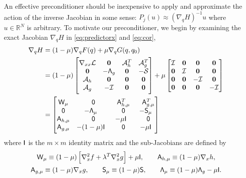 An effective preconditioner should be inexpensive to apply and approximate the
action of the inverse Jacobian in some sense: $P_j(u) \approx (\nabla_q H)^{-1}
u$ where $u \in \mathbb{R}^{N}$ is arbitrary.  To motivate our preconditioner,
we begin by examining the exact Jacobian $\nabla_q H$ in  \eqref{eq:predictorx} and \eqref{eq:cor}, 
\begin{equation}\label{eq:dHdq}
\begin{aligned}
\nabla_q H &= (1 - \mu) \nabla_{q} F(q) + \mu \nabla_q G(q,q_0) \\
&=  (1-\mu)\begin{bmatrix}
 \nabla_{xx} \mathcal{L}   & \boldsymbol{0} & \mathcal{A}^T_h   & \mathcal{A}^T_g   \\
\boldsymbol{0}     &   - \mathsf{\Lambda}_g   & \boldsymbol{0} & -\mathcal{S}     \\
\mathcal{A}_h  &  \boldsymbol{0}   & \boldsymbol{0} &  \boldsymbol{0}  \\
\mathcal{A}_g  & -\mathcal{I}  &  \boldsymbol{0}  & \boldsymbol{0}   \\
\end{bmatrix}
+ \mu \begin{bmatrix}
\mathcal{I} & \boldsymbol{0} & \boldsymbol{0} & \boldsymbol{0} \\
\boldsymbol{0}  & \mathcal{I}  & \boldsymbol{0} & \boldsymbol{0} \\
\boldsymbol{0} & \boldsymbol{0} & -\mathcal{I} &  \boldsymbol{0} \\
\boldsymbol{0} & \boldsymbol{0} &   \boldsymbol{0} & -\mathcal{I} 
\end{bmatrix} \\
& = \begin{bmatrix}
	\mathsf{W}_\mu & \phantom{-}\mathsf{0} & \phantom{-}\mathsf{A}_{h,\mu}^T  & \phantom{-}\mathsf{A}_{g,\mu}^T \\
	\mathsf{0}  & -\mathsf{\Lambda}_\mu & \phantom{-}\mathsf{0}   & -\mathsf{S}_\mu \\
	\mathsf{A}_{h, \mu} & \phantom{-}\mathsf{0} &  -\mu \mathsf{I} & \phantom{-}\mathsf{0}  \\
	\mathsf{A}_{g, \mu} & -(1-\mu)\mathsf{I} &  \phantom{-}\mathsf{0}     &   -\mu \mathsf{I}
\end{bmatrix}
\end{aligned}
\end{equation}
where $\mathsf{I}$ is the $m\times m$ identity matrix and the sub-Jacobians are
defined by
\begin{gather*}
	\mathsf{W}_{\mu} \equiv (1-\mu) \left[\nabla_x^2 f + \lambda^T \nabla_x^2 g\right] + \mu \mathsf{I},\qquad
	\mathsf{A}_{h, \mu} \equiv (1-\mu) \nabla_x h, \\
	\mathsf{A}_{g, \mu} \equiv (1-\mu) \nabla_x g, \qquad 
	\mathsf{S}_{\mu} \equiv (1-\mu)\mathsf{S},\qquad
	\mathsf{\Lambda}_\mu \equiv (1-\mu)  \mathsf{\Lambda}_g - \mu \mathsf{I}. 
\end{gather*}

